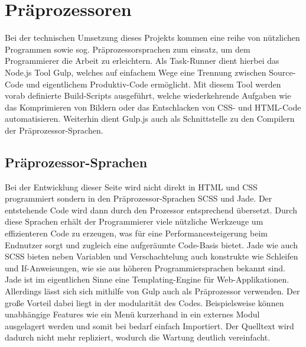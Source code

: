 \section{Präprozessoren}
Bei der technischen Umsetzung dieses Projekts kommen eine reihe von nützlichen Programmen sowie sog. Präprozessorsprachen zum einsatz, um dem Programmierer die Arbeit zu erleichtern.
Als Task-Runner dient hierbei das Node.js Tool Gulp, welches auf einfachem Wege eine Trennung zwischen Source-Code und eigentlichem Produktiv-Code ermöglicht. Mit diesem Tool werden vorab definierte Build-Scripts ausgeführt, welche wiederkehrende Aufgaben wie das Komprimieren von Bildern oder das Entschlacken von CSS- und HTML-Code automatisieren. Weiterhin dient Gulp.js auch als Schnittstelle zu den Compilern der Präprozessor-Sprachen.

\subsection{Präprozessor-Sprachen}
Bei der Entwicklung dieser Seite wird nicht direkt in HTML und CSS programmiert sondern in den Präprozessor-Sprachen SCSS und Jade. Der entstehende Code wird dann durch den Prozessor entsprechend übersetzt.
Durch diese Sprachen erhält der Programmierer viele nützliche Werkzeuge um effizienteren Code zu erzeugen, was für eine Performancesteigerung beim Endnutzer sorgt und zugleich eine aufgeräumte Code-Basis bietet.
Jade wie auch SCSS bieten neben Variablen und Verschachtelung auch konstrukte wie Schleifen und If-Anweisungen, wie sie aus höheren Programmiersprachen bekannt sind.
Jade ist im eigentlichen Sinne eine Templating-Engine für Web-Applikationen. Allerdings lässt sich sich mithilfe von Gulp auch als Präprozessor verwenden. Der große Vorteil dabei liegt in der modularität des Codes. Beispielsweise können unabhängige Features wie ein Menü kurzerhand in ein externes Modul ausgelagert werden und somit bei bedarf einfach Importiert. Der Quelltext wird dadurch nicht mehr repliziert, wodurch die Wartung deutlich vereinfacht.


